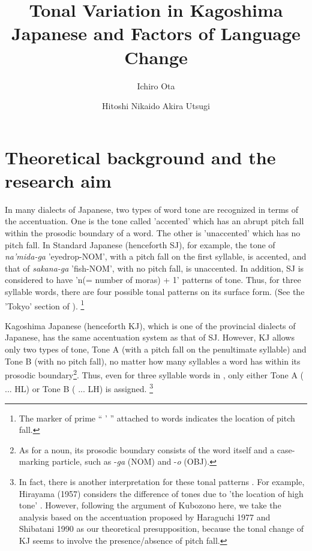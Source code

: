 \documentclass[output=paper]{LSP/langsci}
\author{Ichiro Ota\affiliation{Kagoshima University}\and Hitoshi Nikaido\affiliation{Fukuoka Jo Gakuin University} \lastand Akira Utsugi\affiliation{Nagoya University}}
\title{Tonal Variation in Kagoshima Japanese and Factors of Language Change}
\begin{document}
 

\section{Theoretical background and the research aim}
     In many dialects of Japanese, two types of word tone are recognized in terms of the accentuation. One is the tone called 'accented' which has an abrupt pitch fall within the prosodic boundary of a word. The other is 'unaccented' which has no pitch fall.  In Standard Japanese (henceforth SJ), for example, the tone of \textit{na'mida-ga} 'eyedrop-NOM', with a pitch fall on the first syllable, is accented, and that of \textit{sakana-ga} 'fish-NOM', with no pitch fall, is unaccented. In addition, SJ is considered to have 'n(= number of moras) + 1' patterns of tone. Thus, for three syllable words, there are four possible tonal patterns on its surface form. (See the 'Tokyo' section of ). \footnote{ The marker of prime “ ’ ” attached to words indicates the location of pitch fall.}

     Kagoshima Japanese (henceforth KJ), which is one of the provincial dialects of Japanese, has the same accentuation system as that of SJ. However, KJ allows only two types of tone, Tone A (with a pitch fall on the penultimate syllable) and Tone B (with no pitch fall), no matter how many syllables a word has within its prosodic boundary\footnote{ As for a noun, its prosodic boundary consists of the word itself and a case-marking particle, such as -\textit{ga} (NOM) and -\textit{o} (OBJ).}. Thus, even for three syllable words in , only either Tone A ( ... HL) or Tone B ( ... LH) is assigned. \footnote{ In fact, there is another interpretation for these tonal patterns \citep{kubozono_tonal_2007}. For example, Hirayama (1957) %
considers the difference of tones due to 'the location of high tone' \citep[327]{kubozono_tonal_2007}. However, following the argument of Kubozono here,  we take the analysis based on the accentuation proposed by Haraguchi 1977 and Shibatani 1990 %
as our theoretical presupposition, because the tonal change of KJ seems to involve the presence/absence of pitch fall.  
} 
 
\end{document}
